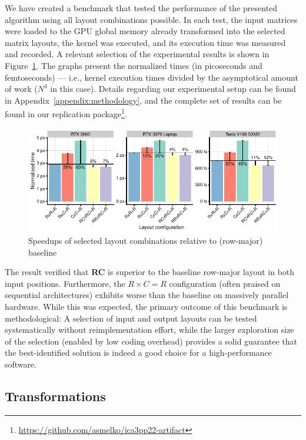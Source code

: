 We have created a benchmark that tested the performance of the presented algorithm using all layout combinations possible. In each test, the input matrices were loaded to the GPU global memory already transformed into the selected matrix layouts, the kernel was executed, and its execution time was measured and recorded. A relevant selection of the experimental results is shown in Figure~\ref{fig:matmul_speedup}. The graphs present the normalized times (in picoseconds and femtoseconds) --- i.e., kernel execution times divided by the asymptotical amount of work ($N^3$ in this case). Details regarding our experimental setup can be found in Appendix~\ref{appendix:methodology}, and the complete set of results can be found in our replication package\footnote{\url{https://github.com/asmelko/ica3pp22-artifact}}.

\begin{figure}
    \centering
    \includegraphics{noarr/plots/matmul_selected.pdf}
    \caption{Speedups of selected layout combinations relative to (row-major) baseline}
    \label{fig:matmul_speedup}
\end{figure}

The result verified that \textbf{RC} is superior to the baseline row-major layout in both input positions. Furthermore, the $R\times C=R$ configuration (often praised on sequential architectures) exhibits worse than the baseline on massively parallel hardware. While this was expected, the primary outcome of this benchmark is methodological: A selection of input and output layouts can be tested systematically without reimplementation effort, while the larger exploration size of the selection (enabled by low coding overhead) provides a solid guarantee that the best-identified solution is indeed a good choice for a high-performance software.


\subsection{Transformations}\label{sec:transformations}

